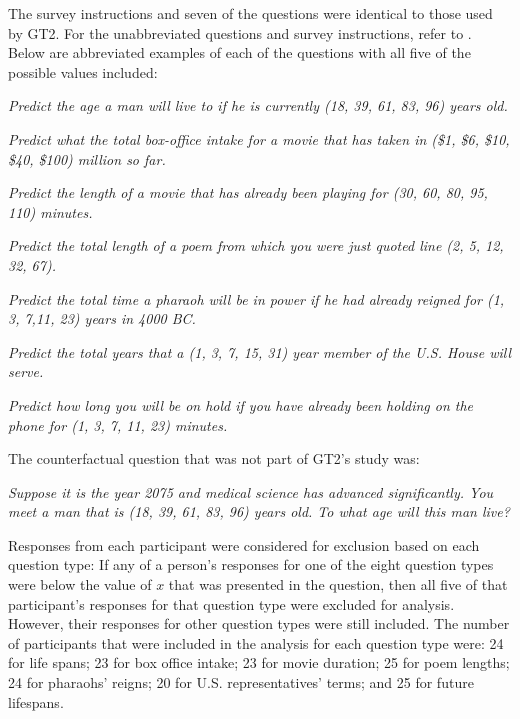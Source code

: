 \documentclass[doc,floatsintext]{apa6}
\begin{document}
The survey instructions and seven of the questions were identical to those used by GT2. For the unabbreviated questions and survey instructions, refer to . Below are abbreviated examples of each of the questions with all five of the possible values included:
\begin{description}[noitemsep]\setlength{\itemindent}{-.2cm}
\item[Lifespans:] {\it Predict the age a man will live to if he is currently (18, 39, 61, 83, 96) years old.}
\item[Movie grosses:] {\it Predict what the total box-office intake for a movie that has taken in (\$1, \$6, \$10, \$40, \$100) million so far.}
\item[Movie runtimes:] {\it Predict the length of a movie that has already been playing for (30, 60, 80, 95, 110) minutes.}
\item[Poem lengths:] {\it Predict the total length of a poem from which you were just quoted line (2, 5, 12, 32, 67).}
\item[Pharaohs' reigns:] {\it Predict the total time a pharaoh will be in power if he had already reigned for (1, 3, 7,11, 23) years in 4000 BC.}
\item[Representatives' terms:] {\it Predict the total years that a (1, 3, 7, 15, 31) year member of the U.S. House will serve.}
\item[Waiting times:] {\it Predict how long you will be on hold if you have already been holding on the phone for (1, 3, 7, 11, 23) minutes.}
\end{description}
The counterfactual question that was not part of GT2's study was:
\begin{description}\setlength{\itemindent}{-.2cm}
\item[Future lifespans:] {\it Suppose it is the year 2075 and medical science has advanced significantly. You meet a man that is (18, 39, 61, 83, 96) years old. To what age will this man live?}
\end{description}
Responses from each participant were considered for exclusion based on each question type: If any of a person's responses for one of the eight question types were below the value of $x$ that was presented in the question, then all five of that participant's responses for that question type were excluded for analysis. However, their responses for other question types were still included. The number of participants that were included in the analysis for each question type were: 24 for life spans; 23 for box office intake; 23 for movie duration; 25 for poem lengths; 24 for pharaohs' reigns; 20 for U.S. representatives' terms; and 25 for future lifespans.
\end{document}

